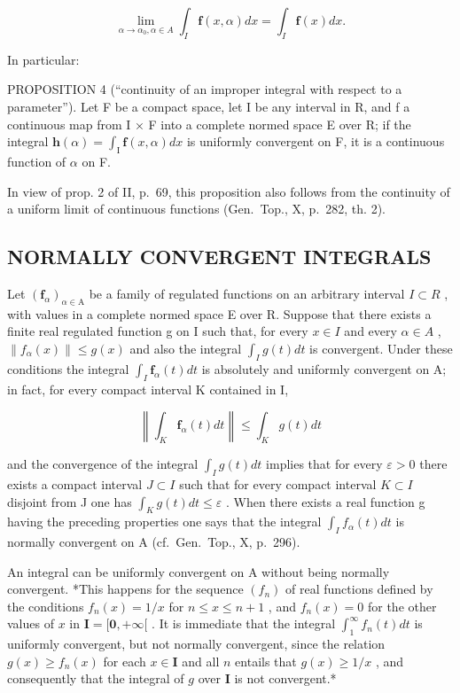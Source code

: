 \[
\lim _ {\alpha \rightarrow \alpha_ {0}, \alpha \in A} \int_ {I} \mathbf {f} (x, \alpha) d x = \int_ {I} \mathbf {f} (x) d x.\tag{10}
\]

In particular:

PROPOSITION 4 (``continuity of an improper integral with respect to a parameter''). Let F be a compact space, let I be any interval in R, and f a continuous map from I × F into a complete normed space E over R; if the integral \(\mathbf{h}(\alpha) = \int_{\mathrm{I}} \mathbf{f}(x, \alpha) dx\) is uniformly convergent on F, it is a continuous function of \(\alpha\) on F.

In view of prop. 2 of II, p.~69, this proposition also follows from the continuity of a uniform limit of continuous functions (Gen.~Top., X, p.~282, th. 2).

\subsection{NORMALLY CONVERGENT INTEGRALS}

Let \((\mathbf{f}_{\alpha})_{\alpha\in\mathrm{A}}\) be a family of regulated functions on an arbitrary interval \(I\subset R\) , with values in a complete normed space E over R. Suppose that there exists a finite real regulated function g on I such that, for every \(x\in I\) and every \(\alpha\in A\) , \(\|f_{\alpha}(x)\|\leqslant g(x)\) and also the integral \(\int_{I}g(t)dt\) is convergent. Under these conditions the integral \(\int_{I}\mathbf{f}_{\alpha}(t)dt\) is absolutely and uniformly convergent on A; in fact, for every compact interval K contained in I,

\[
\left\| \int_ {K} \mathbf {f} _ {\alpha} (t) d t \right\| \leqslant \int_ {K} g (t) d t
\]

and the convergence of the integral \(\int_{I} g(t) dt\) implies that for every \(\varepsilon > 0\) there exists a compact interval \(J \subset I\) such that for every compact interval \(K \subset I\) disjoint from J one has \(\int_{K} g(t) dt \leqslant \varepsilon\) . When there exists a real function g having the preceding properties one says that the integral \(\int_{I} f_{\alpha}(t) dt\) is normally convergent on A (cf.~Gen.~Top., X, p.~296).

An integral can be uniformly convergent on A without being normally convergent. *This happens for the sequence \((f_n)\) of real functions defined by the conditions \(f_n(x) = 1 / x\) for \(n \leqslant x \leqslant n + 1\) , and \(f_n(x) = 0\) for the other values of \(x\) in \(\mathbf{I} = [\mathbf{0}, +\infty[\) . It is immediate that the integral \(\int_{1}^{\infty} f_n(t) dt\) is uniformly convergent, but not normally convergent, since the relation \(g(x) \geqslant f_n(x)\) for each \(x \in \mathbf{I}\) and all \(n\) entails that \(g(x) \geqslant 1 / x\) , and consequently that the integral of \(g\) over \(\mathbf{I}\) is not convergent.*


